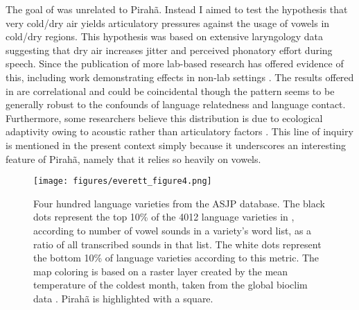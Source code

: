 \documentclass[output=paper,colorlinks,citecolor=brown
]{langscibook}
\begin{document}
    The goal of  was unrelated to Pirahã. Instead I aimed to test the hypothesis that very cold/dry air yields articulatory pressures against the usage of vowels in cold/dry regions. This hypothesis was based on extensive laryngology data suggesting that dry air increases jitter and perceived phonatory effort during speech. Since the publication of  more lab-based research has offered evidence of this, including work demonstrating effects in non-lab settings \citep{alves2019effect}. The results offered in  are correlational and could be coincidental though the pattern seems to be generally robust to the confounds of language relatedness and language contact. Furthermore, some researchers believe this distribution is due to ecological adaptivity owing to acoustic rather than articulatory factors \citep{maddieson2018language}. This line of inquiry is mentioned in the present context simply because it underscores an interesting feature of Pirahã, namely that it relies so heavily on vowels.

    \vfill
    \begin{figure}[H]
    \texttt{[image: figures/everett\_figure4.png]}
    \caption{\label{everett-figure-4}Four hundred language varieties from the ASJP database. The black dots represent the top 10\% of the 4012 language varieties in , according to number of vowel sounds in a variety’s word list, as a ratio of all transcribed sounds in that list. The white dots represent the bottom 10\% of language varieties according to this metric. The map coloring is based on a raster layer created by the mean temperature of the coldest month, taken from the global bioclim data \citep{noce2020new}. Pirahã is highlighted with a square.}
    \end{figure}
    \vfill\pagebreak
\end{document}
